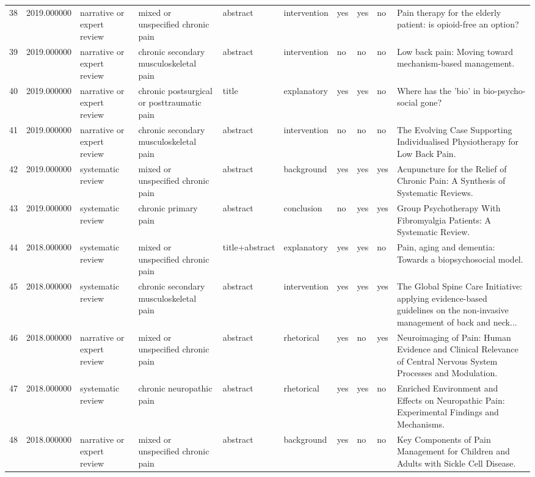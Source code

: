 \begin{longtable}{p{0.7cm}p{0.7cm}p{1.2cm}p{1.9cm}p{1.3cm}p{1.5cm}p{0.55cm}p{0.55cm}p{0.55cm}p{3.2cm}}
38 & 2019.000000 & narrative or expert review & mixed or unspecified chronic pain & abstract & intervention & yes & yes & no & Pain therapy for the elderly patient: is opioid-free an option? \\
39 & 2019.000000 & narrative or expert review & chronic secondary musculoskeletal pain & abstract & intervention & no & no & no & Low back pain: Moving toward mechanism-based management. \\
40 & 2019.000000 & narrative or expert review & chronic postsurgical or posttraumatic pain & title & explanatory & yes & yes & no & Where has the 'bio' in bio-psycho-social gone? \\
41 & 2019.000000 & narrative or expert review & chronic secondary musculoskeletal pain & abstract & intervention & no & no & no & The Evolving Case Supporting Individualised Physiotherapy for Low Back Pain. \\
42 & 2019.000000 & systematic review & mixed or unspecified chronic pain & abstract & background & yes & yes & yes & Acupuncture for the Relief of Chronic Pain: A Synthesis of Systematic Reviews. \\
43 & 2019.000000 & systematic review & chronic primary pain & abstract & conclusion & no & yes & yes & Group Psychotherapy With Fibromyalgia Patients: A Systematic Review. \\
44 & 2018.000000 & systematic review & mixed or unspecified chronic pain & title+abstract & explanatory & yes & yes & no & Pain, aging and dementia: Towards a biopsychosocial model. \\
45 & 2018.000000 & systematic review & chronic secondary musculoskeletal pain & abstract & intervention & yes & yes & yes & The Global Spine Care Initiative: applying evidence-based guidelines on the non-invasive management of back and neck... \\
46 & 2018.000000 & narrative or expert review & mixed or unspecified chronic pain & abstract & rhetorical & yes & no & yes & Neuroimaging of Pain: Human Evidence and Clinical Relevance of Central Nervous System Processes and Modulation. \\
47 & 2018.000000 & systematic review & chronic neuropathic pain & abstract & rhetorical & yes & yes & no & Enriched Environment and Effects on Neuropathic Pain: Experimental Findings and Mechanisms. \\
48 & 2018.000000 & narrative or expert review & mixed or unspecified chronic pain & abstract & background & yes & no & no & Key Components of Pain Management for Children and Adults with Sickle Cell Disease. \\

\end{longtable}
